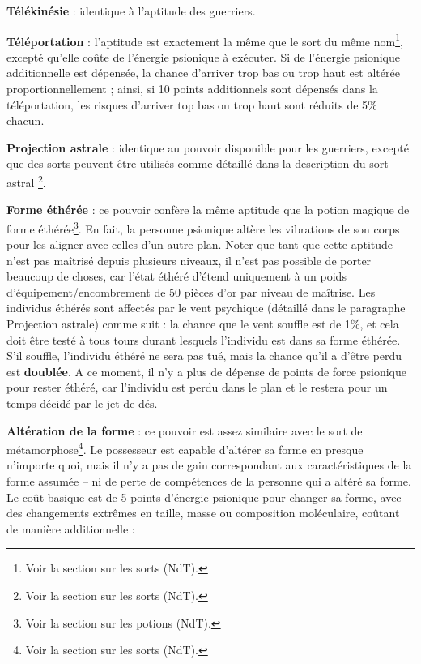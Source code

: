 \documentclass[11pt]{article}
\begin{document}
{\bigskip

\textbf{Télékinésie} : identique à l'aptitude des guerriers.

\bigskip

\textbf{Téléportation} : l'aptitude est exactement la même que le sort du même nom\footnote{Voir la section sur les sorts (NdT).}, excepté qu'elle coûte de l'énergie psionique à exécuter. Si de l'énergie psionique additionnelle est dépensée, la chance d'arriver trop bas ou trop haut est altérée proportionnellement ; ainsi, si 10 points additionnels sont dépensés dans la téléportation, les risques d'arriver top bas ou trop haut sont réduits de 5\% chacun.

\bigskip

\textbf{Projection astrale} : identique au pouvoir disponible pour les guerriers, excepté que des sorts peuvent être utilisés comme détaillé dans la description du \og sort astral \fg{}\footnote{Voir la section sur les sorts (NdT).}.

\bigskip

\textbf{Forme éthérée} : ce pouvoir confère la même aptitude que la potion magique de forme éthérée\footnote{Voir la section sur les potions (NdT).}. En fait, la personne psionique altère les vibrations de son corps pour les aligner avec celles d'un autre plan. Noter que tant que cette aptitude n'est pas maîtrisé depuis plusieurs niveaux, il n'est pas possible de porter beaucoup de choses, car l'état éthéré d'étend uniquement à un poids d'équipement/encombrement de 50 pièces d'or par niveau de maîtrise. Les individus éthérés sont affectés par le vent psychique (détaillé dans le paragraphe Projection astrale) comme suit : la chance que le vent souffle est de 1\%, et cela doit être testé à tous tours durant lesquels l'individu est dans sa forme éthérée. S'il souffle, l'individu éthéré ne sera pas tué, mais la chance qu'il a d'être perdu est \textbf{doublée}. A ce moment, il n'y a plus de dépense de points de force psionique pour rester éthéré, car l'individu est perdu dans le plan et le restera pour un temps décidé par le jet de dés.

\bigskip

\textbf{Altération de la forme} : ce pouvoir est assez similaire avec le sort de métamorphose\footnote{Voir la section sur les sorts (NdT).}. Le possesseur est capable d'altérer sa forme en presque n'importe quoi, mais il n'y a pas de gain correspondant aux caractéristiques de la forme assumée -- ni de perte de compétences de la personne qui a altéré sa forme. Le coût basique est de 5 points d'énergie psionique pour changer sa forme, avec des changements extrêmes en taille, masse ou composition moléculaire, coûtant de manière additionnelle :

}
\end{document}

